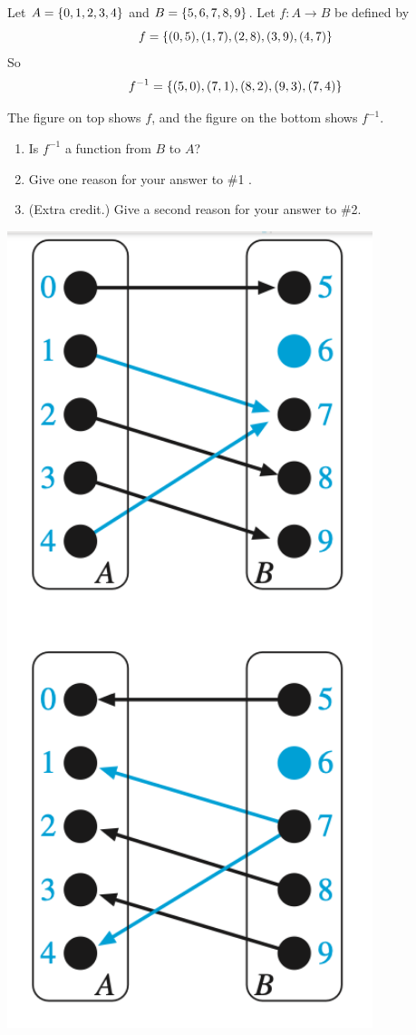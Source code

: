 \documentclass[10pt]{beamer}
\begin{document}
\begin{frame}
\begin{minipage}{0.63\textwidth}
 \begin{myredbox}[title=Reading Quiz (Functions)]
 Let $A = \{ {0,1,2,3,4} \}$ and $B=\{ {5,6,7,8,9} \}$. Let $f: A \to B$ be defined by
 \[  f= \{ {(0,5), (1,7), (2,8), (3,9), (4,7)} \}\]
 So 
 \[ f^{-1} = \{ {(5,0), (7,1), (8,2), (9,3), (7,4)} \}\]  
 
 The figure on top shows $f$, and the figure on the bottom shows $f^{-1}$.
 
\begin{enumerate}
	\item Is $f^{-1}$ a function from $B$ to $A$?
	\item Give one reason for your answer to \#1 .
	\item (Extra credit.) Give a second reason for your answer to \#2.
\end{enumerate}
\end{myredbox}
\end{minipage}
\hfill 
\begin{minipage}{0.35\textwidth}
\includegraphics[width=0.8\textwidth]{images/reading_quiz_plot.png}	

\end{minipage}
\end{frame}
\end{document}
